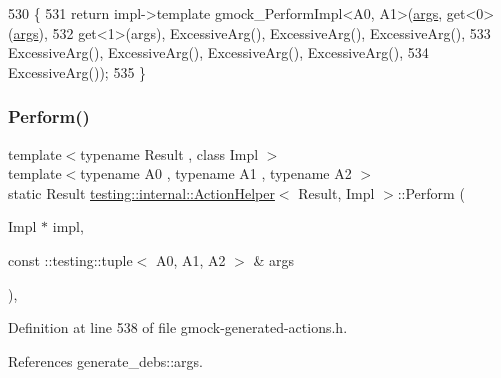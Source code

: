 \begin{DoxyCode}
530                                                                       \{
531     \textcolor{keywordflow}{return} impl->template gmock\_PerformImpl<A0, A1>(\hyperlink{namespacegenerate__debs_a75f9143e38df82d83b2e8a6f99cae02c}{args}, get<0>(\hyperlink{namespacegenerate__debs_a75f9143e38df82d83b2e8a6f99cae02c}{args}),
532         get<1>(args), ExcessiveArg(), ExcessiveArg(), ExcessiveArg(),
533         ExcessiveArg(), ExcessiveArg(), ExcessiveArg(), ExcessiveArg(),
534         ExcessiveArg());
535   \}
\end{DoxyCode}
\mbox{\label{classtesting_1_1internal_1_1ActionHelper_ad450478d185cbcac0e1383f7517f5c36}} 
\subsubsection{\texorpdfstring{Perform()}{Perform()}\hspace{0.1cm}{\footnotesize\ttfamily [4/11]}}
{\footnotesize\ttfamily template$<$typename Result , class Impl $>$ \\
template$<$typename A0 , typename A1 , typename A2 $>$ \\
static Result \hyperlink{classtesting_1_1internal_1_1ActionHelper}{testing\+::internal\+::\+Action\+Helper}$<$ Result, Impl $>$\+::Perform (\begin{DoxyParamCaption}\item[{Impl $\ast$}]{impl,  }\item[{const \+::testing\+::tuple$<$ A0, A1, A2 $>$ \&}]{args }\end{DoxyParamCaption})\hspace{0.3cm}{\ttfamily [inline]}, {\ttfamily [static]}}



Definition at line 538 of file gmock-\/generated-\/actions.\+h.



References generate\+\_\+debs\+::args.


